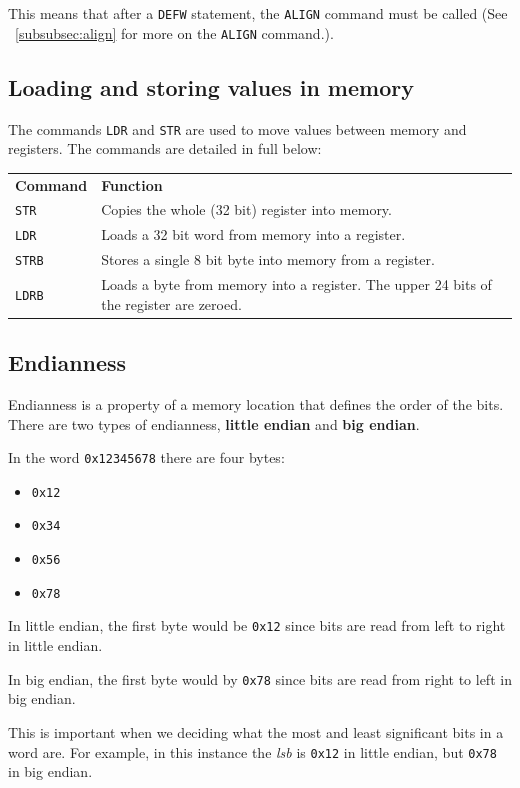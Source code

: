 \documentclass{article}
\begin{document}
This means that after a {\tt DEFW} statement, the {\tt ALIGN} command must be called (See ~\ref{subsubsec:align} for more on the {\tt ALIGN} command.).

\subsection{Loading and storing values in memory}

The commands {\tt LDR} and {\tt STR} are used to move values between memory and registers. The commands are detailed in full below:

\begin{tabularx}{\textwidth}{l X}
	{\bf Command} & {\bf Function}\\
	{\tt STR} & Copies the whole (32 bit) register into memory.\\
	{\tt LDR} & Loads a 32 bit word from memory into a register.\\
	{\tt STRB} & Stores a single 8 bit byte into memory from a register.\\
	{\tt LDRB} & Loads a byte from memory into a register. The upper 24 bits of the register are zeroed.\\
\end{tabularx}

\subsection{Endianness}

Endianness is a property of a memory location that defines the order of the bits. There are two types of endianness, {\bf little endian} and {\bf big endian}.

In the word {\tt 0x12345678} there are four bytes:
\begin{itemize}
	\item {\tt 0x12}
	\item {\tt 0x34}
	\item {\tt 0x56}
	\item {\tt 0x78}
\end{itemize}

In little endian, the first byte would be {\tt 0x12} since bits are read from left to right in little endian.

In big endian, the first byte would by {\tt 0x78} since bits are read from right to left in big endian.

This is important when we deciding what the most and least significant bits in a word are. For example, in this instance the {\it lsb} is {\tt 0x12} in little endian, but {\tt 0x78} in big endian.
\end{document}
